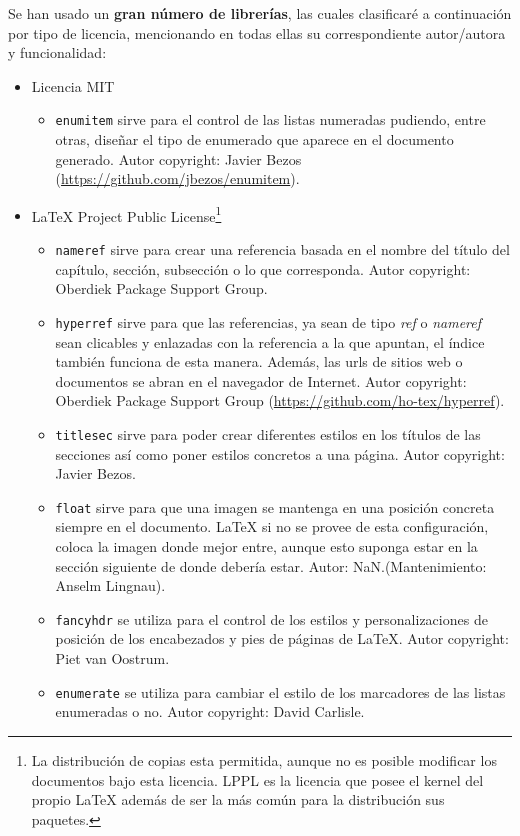 Se han usado un \textbf{gran número de librerías}, las cuales clasificaré a continuación por tipo de licencia, mencionando en todas ellas su correspondiente autor/autora y funcionalidad:
\begin{itemize}
	\item Licencia MIT
	\begin{itemize}
		\item \texttt{enumitem} sirve para el control de las listas numeradas pudiendo, entre otras, diseñar el tipo de enumerado que aparece en el documento generado. Autor copyright: Javier Be­zos (\url{https://github.com/jbezos/enumitem}).
	\end{itemize}
	\item LaTeX Project Public Li­cense\footnote{La distribución de copias esta permitida, aunque no es posible modificar los documentos bajo esta licencia. LPPL es la licencia que posee el kernel del propio LaTeX además de ser la más común para la distribución sus paquetes.}
	\begin{itemize}
		\item \texttt{nameref} sirve para crear una referencia basada en el nombre del título del capítulo, sección, subsección o lo que corresponda. Autor copyright: Oberdiek Pack­age Sup­port Group.
		\item \texttt{hyperref} sirve para que las referencias, ya sean de tipo \textit{ref} o \textit{nameref} sean clicables y enlazadas con la referencia a la que apuntan, el índice también funciona de esta manera. Además, las urls de sitios web o documentos se abran en el navegador de Internet. Autor copyright: Oberdiek Package Support Group (\url{https://github.com/ho-tex/hyperref}).
		\item \texttt{titlesec} sirve para poder crear diferentes estilos en los títulos de las secciones así como poner estilos concretos a una página. Autor copyright: Javier Be­zos.
		\item \texttt{float} sirve para que una imagen se mantenga en una posición concreta siempre en el documento. LaTeX si no se provee de esta configuración, coloca la imagen donde mejor entre, aunque esto suponga estar en la sección siguiente de donde debería estar. Autor: NaN.(Mantenimiento: Anselm Ling­nau).
		\item \texttt{fancyhdr} se utiliza para el control de los estilos y personalizaciones de posición de los encabezados y pies de páginas de LaTeX. Autor copyright: Piet van Oostrum.
		\item \texttt{enumerate} se utiliza para cambiar el estilo de los marcadores de las listas enumeradas o no.  Autor copyright: David Carlisle.

\end{itemize}
\end{itemize}
